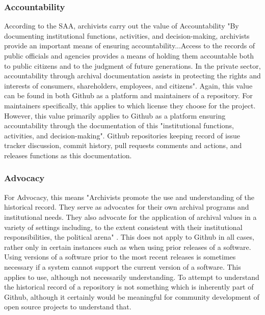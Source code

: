 \subsubsection{Accountability}

According to the SAA, archivists carry out the value of Accountability "By documenting institutional functions, activities, and decision-making, archivists provide an important means of ensuring accountability...Access to the records of public officials and agencies provides a means of holding them accountable both to public citizens and to the judgment of future generations. In the private sector, accountability through archival documentation assists in protecting the rights and interests of consumers, shareholders, employees, and citizens"\cite{rubin2016foundationslis}. Again, this value can be found in both Github as a platform and maintainers of a repository. For maintainers specifically, this applies to which license they choose for the project. However, this value primarily applies to Github as a platform ensuring accountability through the documentation of this "institutional functions, activities, and decision-making". Github repositories keeping record of issue tracker discussion, commit history, pull requests comments and actions, and releases functions as this documentation. 

\subsubsection{Advocacy}

For Advocacy, this means "Archivists promote the use and understanding of the historical record. They serve as advocates for their own archival programs and institutional needs. They also advocate for the application of archival values in a variety of settings including, to the extent consistent with their institutional responsibilities, the political arena" \cite{rubin2016foundationslis}. This does not apply to Github in all cases, rather only in certain instances such as when using prior releases of a software. Using versions of a software prior to the most recent releases is sometimes necessary if a system cannot support the current version of a software. This applies to use, although not necessarily understanding. To attempt to understand the historical record of a repository is not something which is inherently part of Github, although it certainly would be meaningful for community development of open source projects to understand that. 

